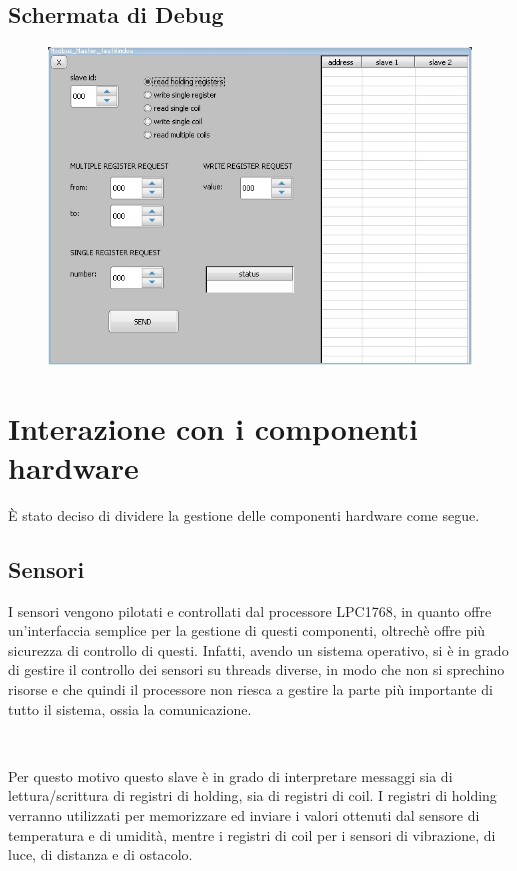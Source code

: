 \documentclass[a4paper,titlepage]{book}
\begin{document}
\newpage
\subsection{Schermata di Debug}

\begin{figure}[!h]
\centering
\includegraphics[scale=0.6]{debug.jpg}
\end{figure}


\section{Interazione con i componenti hardware}

È stato deciso di dividere la gestione delle componenti hardware come segue.

\subsection{Sensori}

I sensori vengono pilotati e controllati dal processore LPC1768, in quanto offre un'interfaccia semplice per la gestione di questi componenti, oltrechè offre più sicurezza di controllo di questi. Infatti, avendo un sistema operativo, si è in grado di gestire il controllo dei sensori su threads diverse, in modo che non si sprechino risorse e che quindi il processore non riesca a gestire la parte più importante di tutto il sistema, ossia la comunicazione.

~

Per questo motivo questo slave è in grado di interpretare messaggi sia di lettura/scrittura di registri di holding, sia di registri di coil. I registri di holding verranno utilizzati per memorizzare ed inviare i valori ottenuti dal sensore di temperatura e di umidità, mentre i registri di coil per i sensori di vibrazione, di luce, di distanza e di ostacolo.
\end{document}
